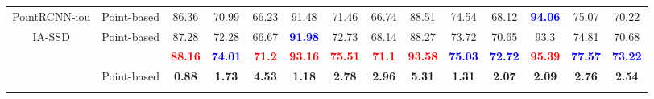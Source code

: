 \begin{table}[t]
{\begin{tabular}{c|c||ccc|ccc|ccc|ccc}
PointRCNN-iou                                                                                     & Point-based                                                       & 86.36                            & 70.99                            & 66.23                            & 91.48                            & 71.46                            & 66.74                            & 88.51                            & 74.54                            & 68.12                            & \textbf{\textcolor{blue}{94.06}} & 75.07                            & 70.22                             \\
IA-SSD                                                                                            & Point-based                                                       & 87.28                            & 72.28                            & 66.67                            & \textbf{\textcolor{blue}{91.98}} & 72.73                            & 68.14                            & 88.27                            & 73.72                            & 70.65                            & 93.3                             & 74.81                            & 70.68                             \\
\rowcolor[rgb]{0.816,0.808,0.808} {\cellcolor[rgb]{0.816,0.808,0.808}}                            & {\cellcolor[rgb]{0.816,0.808,0.808}}                              & \textbf{\textcolor{red}{88.16}}  & \textbf{\textcolor{blue}{74.01}} & \textbf{\textcolor{red}{71.2}}   & \textbf{\textcolor{red}{93.16}}  & \textbf{\textcolor{red}{75.51}}  & \textbf{\textcolor{red}{71.1}}   & \textbf{\textcolor{red}{93.58}}  & \textbf{\textcolor{blue}{75.03}} & \textbf{\textcolor{blue}{72.72}} & \textbf{\textcolor{red}{95.39}}  & \textbf{\textcolor{blue}{77.57}} & \textbf{\textcolor{blue}{73.22}}  \\
\rowcolor[rgb]{0.816,0.808,0.808} \multirow{-2}{*}{{\cellcolor[rgb]{0.816,0.808,0.808}}SPSNet-IA} & \multirow{-2}{*}{{\cellcolor[rgb]{0.816,0.808,0.808}}Point-based} & \textbf{0.88}                    & \textbf{1.73}                    & \textbf{4.53}                    & \textbf{1.18}                    & \textbf{2.78}                    & \textbf{2.96}                    & \textbf{5.31}                    & \textbf{1.31}                    & \textbf{2.07}                    & \textbf{2.09}                    & \textbf{2.76}                    & \textbf{2.54}                     \\
\hhline{>{\arrayrulecolor{black}}-->{\arrayrulecolor{black}}|b|-->{\arrayrulecolor{black}}->{\arrayrulecolor{black}}-->{\arrayrulecolor{black}}->{\arrayrulecolor{black}}-->{\arrayrulecolor{black}}->{\arrayrulecolor{black}}---}
\end{tabular}
}
\end{table}